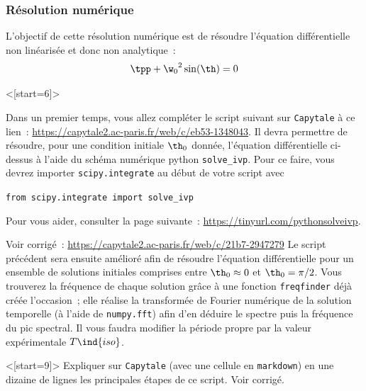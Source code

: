 \documentclass[../main/main.tex]{subfiles}
\begin{document}

\subsubsection{Résolution numérique}

L'objectif de cette résolution numérique est de résoudre l'équation
différentielle non linéarisée et donc non analytique~:
\[
	\tpp + {\w_0}^2 \sin(\th) = 0
\]

\QR<[start=6]>{%
	Dans un premier temps, vous allez compléter le script suivant sur
	\texttt{Capytale} à ce lien~:
	\url{https://capytale2.ac-paris.fr/web/c/eb53-1348043}. Il devra
	permettre de résoudre, pour une condition initiale $\th_0$ donnée,
	l'équation différentielle ci-dessus à l'aide du schéma numérique python
	\texttt{solve\_ivp}. Pour ce faire, vous devrez importer
	\texttt{scipy.integrate} au début de votre script avec
	\begin{center}
		\texttt{from scipy.integrate import solve\_ivp}
	\end{center}
	Pour vous aider, consulter la page suivante~:
	\url{https://tinyurl.com/pythonsolveivp}.
}{%
	Voir corrigé~: \url{https://capytale2.ac-paris.fr/web/c/21b7-2947279}
}
Le script précédent sera ensuite amélioré afin de résoudre l'équation
différentielle pour un ensemble de solutions initiales comprises entre
$\th_0 \approx 0$ et $\th_0 = \pi/2$. Vous trouverez la fréquence de
chaque solution grâce à une fonction \texttt{freqfinder} déjà créée
l'occasion~; elle réalise la transformée de Fourier numérique de
la solution temporelle (à l'aide de \texttt{numpy.fft}) afin d'en
déduire le spectre puis la fréquence du pic spectral. Il vous faudra
modifier la période propre par la valeur expérimentale $T\ind{iso}$.
\bigskip

\QR<[start=9]>{%
	Expliquer sur \texttt{Capytale} (avec une cellule en
	\texttt{markdown}) en une dizaine de lignes les principales étapes de ce
	script.
}{%
	Voir corrigé.
}




\end{document}
